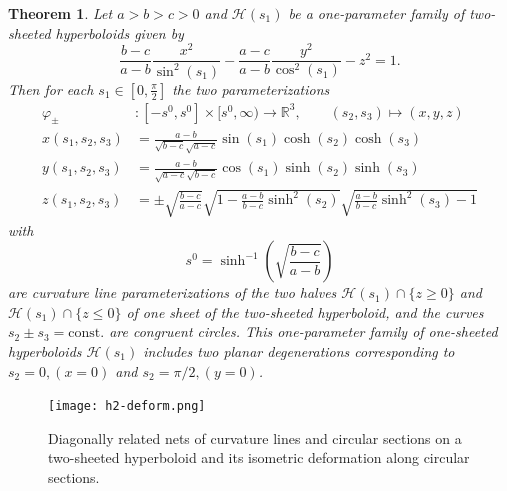 \documentclass[10pt, a4paper]{article}
\theoremstyle{BoldTopSpacing}
\newtheorem{theorem}{Theorem}[section]
\theoremstyle{BoldTopSpacing}
\theoremstyle{BoldTopSpacing}
\theoremstyle{BoldTopBottomSpacing}
\theoremstyle{BoldTopSpacing}
\theoremstyle{BoldTopBottomSpacing}
\theoremstyle{remark}
\begin{document}
\begin{theorem}
\label{thm:isometric-deformation-para-two-hyperboloid}
Let $a > b > c > 0$ and $\mathcal{H}(s_{1})$ be a one-parameter family of two-sheeted hyperboloids given by
\[
    \frac{b - c}{a - b} \frac{x^2}{\sin^2(s_{1})} - \frac{a - c}{a - b} \frac{y^2}{\cos^2(s_{1})} - z^2 = 1.
\]
Then for each $s_{1} \in \left[0, \frac{\pi}{2}\right]$ the two parameterizations
\begin{align*}
    \varphi_{\pm} &: [-s^{0}, s^{0}] \times [s^{0}, \infty) \to \mathbb{R}^3, \quad \quad (s_{2}, s_{3}) \mapsto (x, y, z) \\[10pt]
    x(s_{1}, s_{2}, s_{3}) &= \frac{a - b}{\sqrt{b - c} \sqrt{a - c}} \sin(s_{1}) \cosh(s_{2}) \cosh(s_{3}) \\[10 pt]
    y(s_{1}, s_{2}, s_{3}) &= \frac{a - b}{\sqrt{a - c} \sqrt{b - c}} \cos(s_{1}) \sinh(s_{2}) \sinh(s_{3}) \\[10 pt]
    z(s_{1}, s_{2}, s_{3}) &= \pm \sqrt{\frac{b - c}{a - c}} \sqrt{1 - \frac{a - b}{b - c} \sinh^2(s_{2})} \sqrt{\frac{a - b}{b - c} \sinh^2(s_{3}) - 1}
\end{align*}
with
\[
    s^{0} = \sinh^{-1}\left( \sqrt{ \frac{b - c}{a - b} } \right)
\]
are curvature line parameterizations of the two halves $\mathcal{H}(s_{1}) \cap \{ z \geq 0\}$ and $\mathcal{H}(s_{1}) \cap \{ z \leq 0\}$ of one sheet of the two-sheeted hyperboloid, and the curves $s_{2} \pm s_{3} = \text{const.}$ are congruent circles. \newline
This one-parameter family of one-sheeted hyperboloids $\mathcal{H}(s_{1})$ includes two planar degenerations corresponding to $s_{2} = 0,\left(x = 0 \right)$ and $s_{2} = \pi/2, \left(y = 0 \right)$.
\end{theorem}
\begin{figure}[H]
    \centering
    \texttt{[image: h2-deform.png]}
    \caption[Isometric deformation of two-sheeted hyperboloid along circular sections.]{Diagonally related nets of curvature lines and circular sections on a two-sheeted hyperboloid and its isometric deformation along circular sections.}
    \label{fig:h2-deform}
\end{figure}
\pagebreak
\pagestyle{tocstyle}


\end{document}
